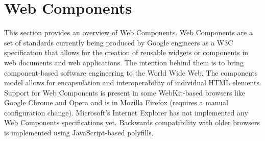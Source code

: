 \section{Web Components}
\label{sec:web_components}
This section provides an overview of Web  Components.
Web Components are a set of standards currently being produced by Google engineers as a W3C specification that allows for the creation of reusable widgets or components in web documents and web  applications.  The intention behind them is to bring component-based software engineering to the World Wide Web. The components model allows for encapsulation and interoperability of individual HTML elements.
\newline
Support for Web Components is present in some WebKit-based browsers like Google Chrome and Opera and is in Mozilla Firefox (requires a manual configuration change). Microsoft’s Internet Explorer has not implemented any Web Components specifications yet. Backwards compatibility with older browsers is implemented using JavaScript-based polyfills.\cite{tch_webcomp}

